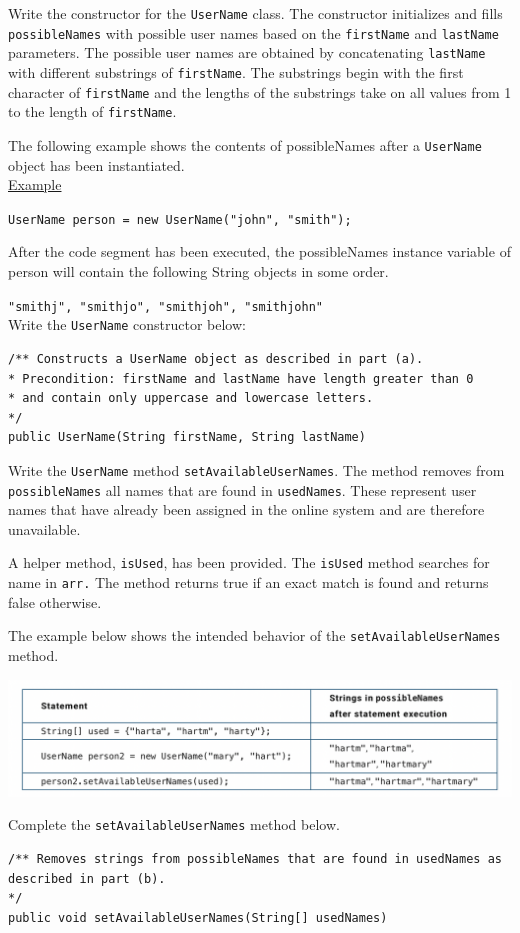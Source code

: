 \documentclass{exam}
\begin{document}
\begin{questions}
\question

Write the constructor for the \texttt{UserName}  class. The constructor initializes and fills \texttt{possibleNames}  with possible user names based on the  \texttt{firstName} and  \texttt{lastName} parameters. The possible user names are obtained by concatenating  \texttt{lastName} with different substrings of  \texttt{firstName}. The substrings begin with the first character of  \texttt{firstName} and the lengths of the substrings take on all values from 1 to the length of  \texttt{firstName}.

The following example shows the contents of possibleNames after a  \texttt{UserName} object has been instantiated.\\

\underline{Example}

 \texttt{UserName person = new UserName("john", "smith");}

After the code segment has been executed, the possibleNames instance variable of person will contain the following String objects in some order.

 \texttt{"smithj", "smithjo", "smithjoh", "smithjohn"}\\

Write the  \texttt{UserName} constructor below:

\begin{lstlisting}
/** Constructs a UserName object as described in part (a).
* Precondition: firstName and lastName have length greater than 0
* and contain only uppercase and lowercase letters.
*/
public UserName(String firstName, String lastName)

\end{lstlisting}
\newpage
\question
Write the \texttt{UserName} method \texttt{setAvailableUserNames}. The method removes from \texttt{possibleNames} all names that are found in \texttt{usedNames}. These represent user names that have already been assigned in the online system and are therefore unavailable.

A helper method, \texttt{isUsed}, has been provided. The \texttt{isUsed} method searches for name in \texttt{arr.} The method returns true if an exact match is found and returns false otherwise.

The example below shows the intended behavior of the \texttt{setAvailableUserNames} method.

\includegraphics[scale=0.5]{table.png}


Complete the  \texttt{setAvailableUserNames} method below.
\begin{lstlisting}
/** Removes strings from possibleNames that are found in usedNames as described in part (b).
*/
public void setAvailableUserNames(String[] usedNames)
\end{lstlisting}
\end{questions}
\end{document}
